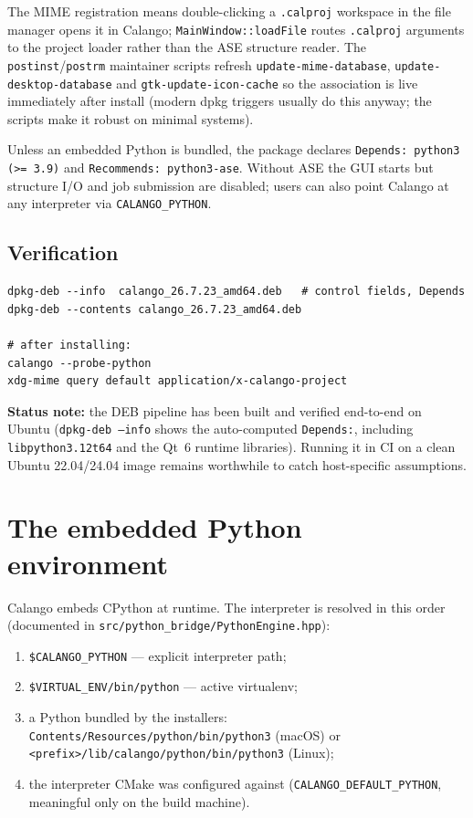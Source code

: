 \documentclass[11pt,a4paper]{article}
\newcommand{\file}[1]{\texttt{#1}}
\newcommand{\opt}[1]{\texttt{#1}}
\begin{document}
The MIME registration means double-clicking a \file{.calproj} workspace
in the file manager opens it in Calango; \file{MainWindow::loadFile}
routes \file{.calproj} arguments to the project loader rather than the
ASE structure reader. The \file{postinst}/\file{postrm} maintainer
scripts refresh \file{update-mime-database},
\file{update-desktop-database} and \file{gtk-update-icon-cache} so the
association is live immediately after install (modern dpkg triggers
usually do this anyway; the scripts make it robust on minimal systems).

Unless an embedded Python is bundled, the package declares
\texttt{Depends: python3 (>= 3.9)} and \texttt{Recommends: python3-ase}.
Without ASE the GUI starts but structure I/O and job submission are
disabled; users can also point Calango at any interpreter via
\texttt{CALANGO\_PYTHON}.

\subsection{Verification}

\begin{lstlisting}
dpkg-deb --info  calango_26.7.23_amd64.deb   # control fields, Depends
dpkg-deb --contents calango_26.7.23_amd64.deb

# after installing:
calango --probe-python
xdg-mime query default application/x-calango-project
\end{lstlisting}

\noindent
\textbf{Status note:} the DEB pipeline has been built and verified
end-to-end on Ubuntu (\file{dpkg-deb --info} shows the auto-computed
\texttt{Depends:}, including \opt{libpython3.12t64} and the Qt~6 runtime
libraries). Running it in CI on a clean Ubuntu 22.04/24.04 image remains
worthwhile to catch host-specific assumptions.

\section{The embedded Python environment}
\label{sec:python-embed}

Calango embeds CPython at runtime. The interpreter is resolved in this
order (documented in \file{src/python\_bridge/PythonEngine.hpp}):

\begin{enumerate}[itemsep=1pt]
  \item \texttt{\$CALANGO\_PYTHON} --- explicit interpreter path;
  \item \texttt{\$VIRTUAL\_ENV/bin/python} --- active virtualenv;
  \item a Python bundled by the installers:
        \file{Contents/Resources/python/bin/python3} (macOS) or
        \file{<prefix>/lib/calango/python/bin/python3} (Linux);
  \item the interpreter CMake was configured against
        (\opt{CALANGO\_DEFAULT\_PYTHON}, meaningful only on the build
        machine).
\end{enumerate}
\end{document}
